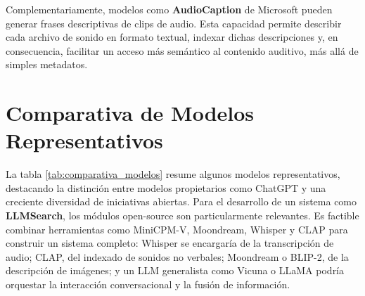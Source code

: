Complementariamente, modelos como \textbf{AudioCaption} de Microsoft pueden generar frases descriptivas de clips de audio. Esta capacidad permite describir cada archivo de sonido en formato textual, indexar dichas descripciones y, en consecuencia, facilitar un acceso más semántico al contenido auditivo, más allá de simples metadatos.

\section{Comparativa de Modelos Representativos}
\label{sec:comparativa}

La tabla \ref{tab:comparativa_modelos} resume algunos modelos representativos, destacando la distinción entre modelos propietarios como ChatGPT y una creciente diversidad de iniciativas abiertas. Para el desarrollo de un sistema como \textbf{LLMSearch}, los módulos open-source son particularmente relevantes. Es factible combinar herramientas como MiniCPM-V, Moondream, Whisper y CLAP para construir un sistema completo: Whisper se encargaría de la transcripción de audio; CLAP, del indexado de sonidos no verbales; Moondream o BLIP-2, de la descripción de imágenes; y un LLM generalista como Vicuna o LLaMA podría orquestar la interacción conversacional y la fusión de información.

\begin{table}[h!]
  \centering
  \captionsetup{justification=centering} %
  \caption{Comparativa de modelos representativos en lenguaje y multimodalidad.}
  \label{tab:comparativa_modelos}
\end{table}

